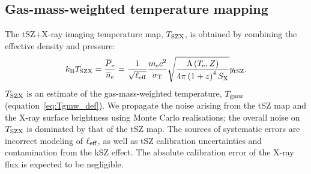 \documentclass[twocolumn,traditabstract]{aa}
\def\TSZ {T_{\rm SZX}}
\def\TMW {T_{\rm gmw}}
\begin{document}
\subsection{Gas-mass-weighted temperature mapping}\label{sec:Gas_mass_weighted_temperature_mapping}
The tSZ+X-ray imaging temperature map, $\TSZ$, is obtained by combining the effective density and pressure: 
\begin{equation}
	k_{\rm B} \TSZ 
	= \frac{\overline{P}_{\rm e}}{\overline{n}_{\rm e}} = \frac{1}{\sqrt{\ell_{\rm eff}}} \frac{m_{\rm e} c^2}{\sigma_{\rm T}} \sqrt{\frac{\Lambda\left(T_{\rm e}, Z\right)}{4 \pi \left(1+z\right)^4 S_{\rm X}}} y_{\rm tSZ}.
\label{eq:pseudo_tsz}
\end{equation}
$\TSZ$ is an estimate of the gas-mass-weighted temperature, $\TMW$ (equation~\ref{eq:Tgmw_def}). We propagate the noise arising from the tSZ map and the X-ray surface brightness using Monte Carlo realisations; the overall noise on $\TSZ$ is dominated by that of the tSZ map. The sources of systematic errors are incorrect modeling of $\ell_{\rm eff}$, as well as tSZ calibration uncertainties and contamination from the kSZ effect. The absolute calibration error of the X-ray flux is expected to be negligible.
\end{document}
